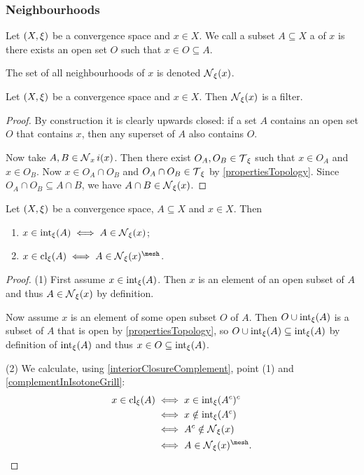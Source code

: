 \subsubsection{Neighbourhoods}
\begin{definition}
Let $\sSet{X,\xi}$ be a convergence space and $x\in X$. We call a subset $A\subseteq X$ a  of $x$ is there exists an open set $O$ such that $x\in O \subseteq A$.

The set of all neighbourhoods of $x$ is denoted $\operatorname{\mathcal{N}}_\xi(x)$.
\end{definition}
\begin{lemma}
Let $\sSet{X,\xi}$ be a convergence space and $x\in X$. Then $\operatorname{\mathcal{N}}_\xi(x)$ is a filter.
\end{lemma}
\begin{proof}
By construction it is clearly upwards closed: if a set $A$ contains an open set $O$ that contains $x$, then any superset of $A$ also contains $O$.

Now take $A,B\in \operatorname{\mathcal{N}}_xi(x)$. Then there exist $O_A, O_B \in \operatorname{\mathcal{T}}_\xi$ such that $x\in O_A$ and $x\in O_B$. Now $x\in O_A\cap O_B$ and $O_A\cap O_B \in \operatorname{\mathcal{T}}_\xi$ by \ref{propertiesTopology}. Since $O_A\cap O_B\subseteq A\cap B$, we have $A\cap B\in \operatorname{\mathcal{N}}_\xi(x)$.
\end{proof}

\begin{proposition} \label{interiorClosureMembership}
Let $\sSet{X,\xi}$ be a convergence space, $A\subseteq X$ and $x\in X$. Then
\begin{enumerate}
\item $x\in \operatorname{int}_\xi(A) \iff A \in \operatorname{\mathcal{N}}_\xi(x)$;
\item $x\in \closure_\xi(A) \iff A \in \neighbourhoods_\xi(x)^{\mesh}$.
\end{enumerate}
\end{proposition}
\begin{proof}
(1) First assume $x\in \operatorname{int}_\xi(A)$. Then $x$ is an element of an open subset of $A$ and thus $A\in \operatorname{\mathcal{N}}_\xi(x)$ by definition.

Now assume $x$ is an element of some open subset $O$ of $A$. Then $O \cup \operatorname{int}_\xi(A)$ is a subset of $A$ that is open by \ref{propertiesTopology}, so $O \cup \operatorname{int}_\xi(A) \subseteq \operatorname{int}_\xi(A)$ by definition of $\operatorname{int}_\xi(A)$ and thus $x\in O\subseteq \operatorname{int}_\xi(A)$.

(2) We calculate, using \ref{interiorClosureComplement}, point (1) and \ref{complementInIsotoneGrill}:
\begin{align*}
x\in \closure_\xi(A) &\iff x\in \interior_\xi(A^c)^c \\
&\iff x\notin \interior_\xi(A^c) \\
&\iff A^c \notin \neighbourhoods_\xi(x) \\
&\iff A \in \neighbourhoods_\xi(x)^\mesh.
\end{align*}
\end{proof}

